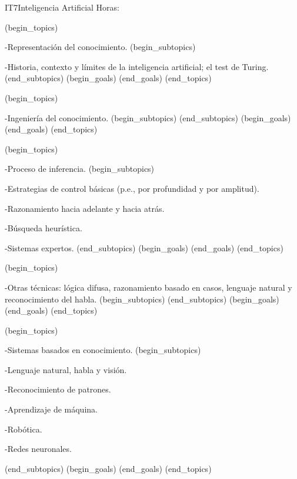 \begin{BKL2}{IT7}{Inteligencia Artificial}
Horas:
 
(begin_topics)

-Representación del conocimiento.
(begin_subtopics)

-Historia, contexto y límites de la inteligencia artificial; el test de Turing.
(end_subtopics)
(begin_goals)
(end_goals)
(end_topics)

 

(begin_topics)

-Ingeniería del conocimiento.
(begin_subtopics)
(end_subtopics)
(begin_goals)
(end_goals)
(end_topics)

 

(begin_topics)

-Proceso de inferencia.
(begin_subtopics)

-Estrategias de control básicas (p.e., por profundidad y por amplitud).

-Razonamiento hacia adelante y hacia atrás.

-Búsqueda heurística.

-Sistemas expertos.
(end_subtopics)
(begin_goals)
(end_goals)
(end_topics)

 

(begin_topics)

-Otras técnicas: lógica difusa, razonamiento basado en casos, lenguaje natural y reconocimiento del habla.
(begin_subtopics)
(end_subtopics)
(begin_goals)
(end_goals)
(end_topics)

 

(begin_topics)

-Sistemas basados en conocimiento.
(begin_subtopics)

-Lenguaje natural, habla y visión.

-Reconocimiento de patrones.

-Aprendizaje de máquina.

-Robótica.

-Redes neuronales.

(end_subtopics)
(begin_goals)
(end_goals)
(end_topics)

\end{BKL2}



